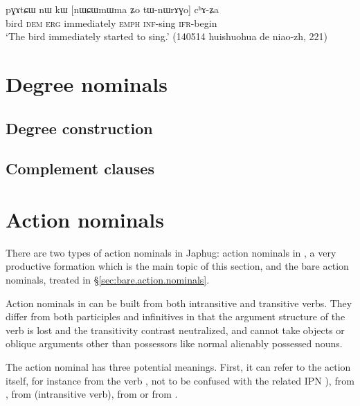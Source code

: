\begin{exe}
\ex \label{ex:tWnWrAGo}
\gll pɣɤtɕɯ nɯ kɯ [nɯɕɯmɯma ʑo tɯ-nɯrɤɣo] cʰɤ-ʑa \\
bird \textsc{dem} \textsc{erg} immediately \textsc{emph} \textsc{inf}-sing \textsc{ifr}-begin \\
\glt `The bird immediately started to sing.' (140514 huishuohua de niao-zh, 221)
\end{exe}

\section{Degree nominals} \label{sec:degree.nominals}

\subsection{Degree construction}
\subsection{Complement clauses}

\section{Action nominals} \label{sec:action.nominals}
There are two types of action nominals in Japhug: action nominals in , a very productive formation which is the main topic of this section, and the bare action nominals, treated in §\ref{sec:bare.action.nominals}.

Action nominals in  can be built from both intransitive and transitive verbs. They differ from both participles and infinitives in that the argument structure of the verb is lost and the transitivity contrast neutralized, and cannot take objects or oblique arguments other than possessors like normal alienably possessed nouns.


The action nominal has three potential meanings.  First, it can refer to the action itself, for instance  from the verb , not to be confused with the related IPN ),  from ,  from  (intransitive verb),  from  or  from .

